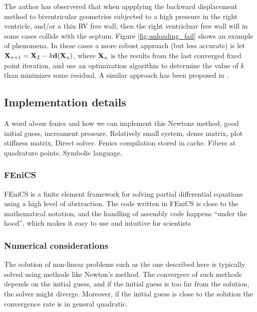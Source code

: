 \begin{remark}
  The author has observered that when appplying the backward
  displacement method to biventricular geometries subjected to a high
  pressure in the right ventricle, and/or a thin RV free wall, then
  the right ventricluar free wall will in some cases collide with the
  septum. Figure \ref{fig:unloading_fail} shows an example of
  phenomena. In these cases a more robust approach (but less accurate)
  is let $\mathbf{X}_{n+1} = \mathbf{X}_{\mathcal{I}} - k \mathbf{d}(\mathbf{X}_n)$,
  where $\mathbf{X}_n$ is the results from the last converged fixed point
  iteration, and use an optimization algorithm to determine the value
  of $k$ than minimizes some residual. A similar approach has been
  proposed in \cite{raghavan2006non}. 
\end{remark}



\subsection{Implementation details}
A word abour fenics and how we can implement this
Newtons method, good initial guess, increament pressure.
Relatively small system, dense matrix, plot stiffness matrix, Direct
solver.
Fenics compilation stored in cache.
Fibers at quadrature points. Symbolic language.

\subsubsection{FEniCS}
FEniCS is a finite element framework for solving partial differential
equations using a high level of abstraction. The code written in
FEniCS is close to the mathematical notation, and the handling of
assembly code happens ``under the hood'', which makes it easy to use
and intuitive for scientists 

\subsubsection{Numerical considerations}
The solution of non-linear problems such as the one described here is
typically solved using methods like Newton's method. The convergece of
such methods depends on the initial guess, and if the
initial guess is too far from the solution, the solver might diverge.
Moreover, if the initial guess is close to the solution the
convergence rate is in general quadratic.

